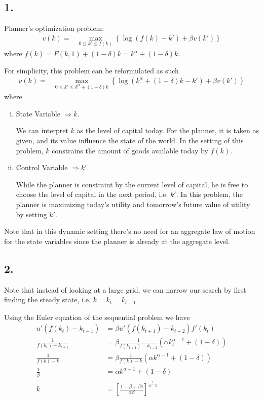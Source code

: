 \documentclass[12pt]{article}
\theoremstyle{definition}
\begin{document}
\subsection*{1.}

Planner's optimization problem:
\begin{align*}
	v(k)=&\max_{ 0\leq k'\leq f(k)}\left\lbrace   \log(f(k)-k') +\beta v(k')\right\rbrace
\end{align*}
where $f(k)=F(k,1)+(1-\delta)k = k^\alpha + (1-\delta)k$.

For simplicity, this problem can be reformulated as such
\begin{align*}
v(k)=&\max_{ 0\leq k'\leq k^\alpha + (1-\delta)k}\left\lbrace   \log(k^\alpha + (1-\delta)k-k') +\beta v(k') \right\rbrace
\end{align*}
where
\begin{enumerate}[(i)]
	\item State Variable $\Rightarrow k$.
	
	We can interpret $k$ as the level of capital today. For the planner, it is taken as given, and its value influence the state of the world. In the setting of this problem, $k$ constrains the amount of goods available today by $f(k)$.
	\item Control Variable $\Rightarrow k'$.
	
	While the planner is constraint by the current level of capital, he is free to choose the level of capital in the next period, i.e. $k'$. In this problem, the planner is maximizing today's utility and tomorrow's future value of utility by setting $k'$.
\end{enumerate}

Note that in this dynamic setting there's no need for an aggregate law of motion for the state variables since the planner is already at the aggregate level.

\subsection*{2.}

Note that instead of looking at a large grid, we can narrow our search by first finding the steady state, i.e. $k=k_t=k_{t+1}$.

Using the Euler equation of the sequential problem we have
\begin{align*}
	u'(f(k_t)-k_{t+1})&=\beta u'(f(k_{t+1})-k_{t+2})f'(k_t)\\
	\frac{1}{f(k_t)-k_{t+1}}&=\beta \frac{1}{f(k_{t+1})-k_{t+2}}(\alpha k_t^{\alpha-1}+(1-\delta))\\
	\frac{1}{f(k)-k}&=\beta \frac{1}{f(k)-k}(\alpha k^{\alpha-1}+(1-\delta))\\
	\frac{1}{\beta}&=\alpha k^{\alpha-1}+(1-\delta)\\
	k&=\left[ \frac{1-\beta +\beta \delta}{\alpha\beta }\right]^{\frac{1}{{\alpha-1}}} \\
\end{align*}
\end{document}
